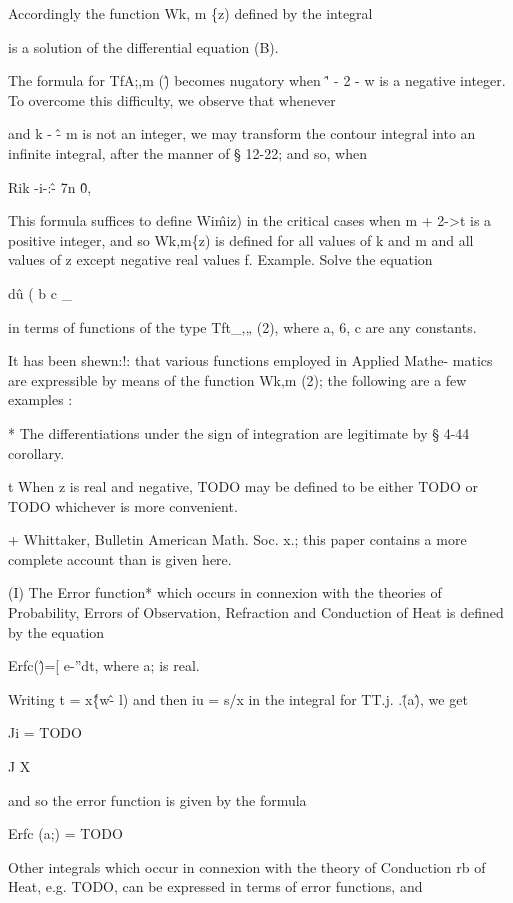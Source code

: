 Accordingly the function Wk, m \{z) defined by the integral

is a solution of the differential equation (B).

The formula for TfA;,m (\^) becomes nugatory when \^' - 2 - w is a
negative integer. To overcome this difficulty, we observe that
whenever

and k - \^- m is not an integer, we may transform the contour integral
into an infinite integral, after the manner of § 12-22; and so, when

Rik -i-:\^- 7n \^0,

This formula suffices to define Wi\^miz) in the critical cases when m
+ 2->t is a positive integer, and so Wk,m\{z) is defined for all
values of k and m and all values of z except negative real values f.
Example. Solve the equation

d\^u ( b c \_

in terms of functions of the type Tft\_,„ (2), where a, 6, c are any
constants.


It has been shewn:!: that various functions employed in Applied Mathe-
matics are expressible by means of the function Wk,m (2); the
following are a few examples :

* The differentiations under the sign of integration are legitimate by
§ 4-44 corollary.

t When z is real and negative, TODO may be defined to be either TODO
or TODO whichever is more convenient.

+ Whittaker, Bulletin American Math. Soc. x.; this paper contains a
more complete account than is given here.

%
%
(I) The Error function* which occurs in connexion with the theories of
Probability, Errors of Observation, Refraction and Conduction of Heat
is defined by the equation

Erfc(\^)=[ e-''dt, where a; is real.

Writing t = x\^\{w\^ - l) and then iu = s/x in the integral for TT.j.
.\^(a\^), we get

Ji = TODO

J X

and so the error function is given by the formula

Erfc (a;) = TODO

Other integrals which occur in connexion with the theory of Conduction
rb of Heat, e.g. TODO, can be expressed in terms of error functions,
and

